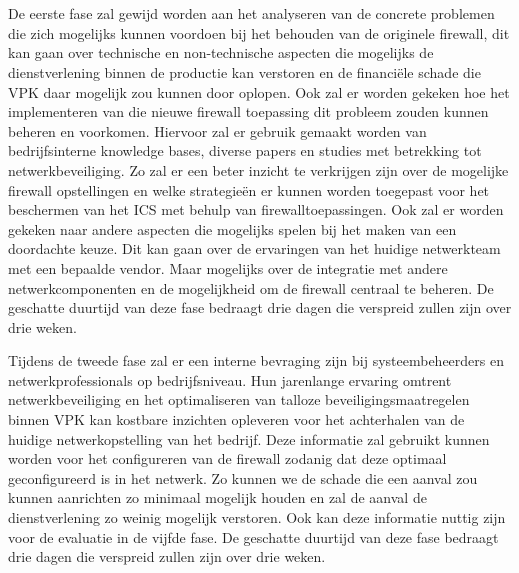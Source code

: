 
\chapter{}%
\label{ch:methodologie}

De eerste fase zal gewijd worden aan het analyseren van de concrete problemen die zich mogelijks kunnen voordoen bij het behouden van de originele firewall, dit kan gaan over technische en non-technische aspecten die mogelijks de dienstverlening binnen de productie kan verstoren en de financiële schade die VPK daar mogelijk zou kunnen door oplopen. Ook zal er worden gekeken hoe het implementeren van die nieuwe firewall toepassing dit probleem zouden kunnen beheren en voorkomen. Hiervoor zal er gebruik gemaakt worden van bedrijfsinterne knowledge bases, diverse papers en studies met betrekking tot netwerkbeveiliging. Zo zal er een beter inzicht te verkrijgen zijn over de mogelijke firewall opstellingen en welke strategieën er kunnen worden toegepast voor het beschermen van het ICS met behulp van firewalltoepassingen. Ook zal er worden gekeken naar andere aspecten die mogelijks spelen bij het maken van een doordachte keuze. Dit kan gaan over de ervaringen van het huidige netwerkteam met een bepaalde vendor. Maar mogelijks over de integratie met andere netwerkcomponenten en de mogelijkheid om de firewall centraal te beheren. De geschatte duurtijd van deze fase bedraagt drie dagen die verspreid zullen zijn over drie weken.


Tijdens de tweede fase zal er een interne bevraging zijn bij systeembeheerders en netwerkprofessionals op bedrijfsniveau. Hun jarenlange ervaring omtrent netwerkbeveiliging en het optimaliseren van talloze beveiligingsmaatregelen binnen VPK kan kostbare inzichten opleveren voor het achterhalen van de huidige netwerkopstelling van het bedrijf. Deze informatie zal gebruikt kunnen worden voor het configureren van de firewall zodanig dat deze optimaal geconfigureerd is in het netwerk. Zo kunnen we de schade die een aanval zou kunnen aanrichten zo minimaal mogelijk houden en zal de aanval de dienstverlening zo weinig mogelijk verstoren. Ook kan deze informatie nuttig zijn voor de evaluatie in de vijfde fase. De geschatte duurtijd van deze fase bedraagt drie dagen die verspreid zullen zijn over drie weken.

